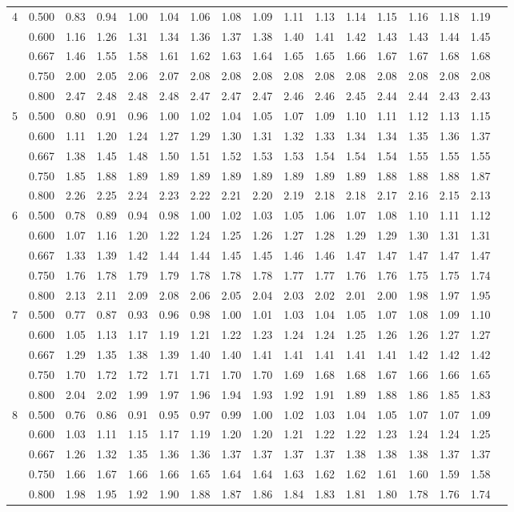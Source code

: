 {\begin{center}
\begin{tabular}{rrr@{\,}r@{\,}r@{\,}r@{\,}r@{\,}r@{\,}r@{\,}r
                   @{\,}r@{\,}r@{\,}r@{\,}r@{\,}r@{\,}r@{\,}r}
4&0.500&0.83&0.94&1.00&1.04&1.06&1.08&1.09&1.11&1.13&1.14&1.15&1.16&1.18&1.19\\
 &0.600&1.16&1.26&1.31&1.34&1.36&1.37&1.38&1.40&1.41&1.42&1.43&1.43&1.44&1.45\\
 &0.667&1.46&1.55&1.58&1.61&1.62&1.63&1.64&1.65&1.65&1.66&1.67&1.67&1.68&1.68\\
 &0.750&2.00&2.05&2.06&2.07&2.08&2.08&2.08&2.08&2.08&2.08&2.08&2.08&2.08&2.08\\
 &0.800&2.47&2.48&2.48&2.48&2.47&2.47&2.47&2.46&2.46&2.45&2.44&2.44&2.43&2.43\\
5&0.500&0.80&0.91&0.96&1.00&1.02&1.04&1.05&1.07&1.09&1.10&1.11&1.12&1.13&1.15\\
 &0.600&1.11&1.20&1.24&1.27&1.29&1.30&1.31&1.32&1.33&1.34&1.34&1.35&1.36&1.37\\
 &0.667&1.38&1.45&1.48&1.50&1.51&1.52&1.53&1.53&1.54&1.54&1.54&1.55&1.55&1.55\\
 &0.750&1.85&1.88&1.89&1.89&1.89&1.89&1.89&1.89&1.89&1.89&1.88&1.88&1.88&1.87\\
 &0.800&2.26&2.25&2.24&2.23&2.22&2.21&2.20&2.19&2.18&2.18&2.17&2.16&2.15&2.13\\
6&0.500&0.78&0.89&0.94&0.98&1.00&1.02&1.03&1.05&1.06&1.07&1.08&1.10&1.11&1.12\\
 &0.600&1.07&1.16&1.20&1.22&1.24&1.25&1.26&1.27&1.28&1.29&1.29&1.30&1.31&1.31\\
 &0.667&1.33&1.39&1.42&1.44&1.44&1.45&1.45&1.46&1.46&1.47&1.47&1.47&1.47&1.47\\
 &0.750&1.76&1.78&1.79&1.79&1.78&1.78&1.78&1.77&1.77&1.76&1.76&1.75&1.75&1.74\\
 &0.800&2.13&2.11&2.09&2.08&2.06&2.05&2.04&2.03&2.02&2.01&2.00&1.98&1.97&1.95\\
7&0.500&0.77&0.87&0.93&0.96&0.98&1.00&1.01&1.03&1.04&1.05&1.07&1.08&1.09&1.10\\
 &0.600&1.05&1.13&1.17&1.19&1.21&1.22&1.23&1.24&1.24&1.25&1.26&1.26&1.27&1.27\\
 &0.667&1.29&1.35&1.38&1.39&1.40&1.40&1.41&1.41&1.41&1.41&1.41&1.42&1.42&1.42\\
 &0.750&1.70&1.72&1.72&1.71&1.71&1.70&1.70&1.69&1.68&1.68&1.67&1.66&1.66&1.65\\
 &0.800&2.04&2.02&1.99&1.97&1.96&1.94&1.93&1.92&1.91&1.89&1.88&1.86&1.85&1.83\\
8&0.500&0.76&0.86&0.91&0.95&0.97&0.99&1.00&1.02&1.03&1.04&1.05&1.07&1.07&1.09\\
 &0.600&1.03&1.11&1.15&1.17&1.19&1.20&1.20&1.21&1.22&1.22&1.23&1.24&1.24&1.25\\
 &0.667&1.26&1.32&1.35&1.36&1.36&1.37&1.37&1.37&1.37&1.38&1.38&1.38&1.37&1.37\\
 &0.750&1.66&1.67&1.66&1.66&1.65&1.64&1.64&1.63&1.62&1.62&1.61&1.60&1.59&1.58\\
 &0.800&1.98&1.95&1.92&1.90&1.88&1.87&1.86&1.84&1.83&1.81&1.80&1.78&1.76&1.74
\end{tabular}
\end{center}


}
